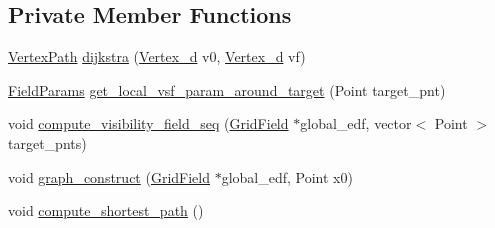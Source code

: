\subsection*{Private Member Functions}
\begin{DoxyCompactItemize}
\item 
\hyperlink{_common_8h_a225da2de31d0161f43841ed31cac064c}{Vertex\+Path} \hyperlink{class_preplanner_adff9209bb0422e7105f8bd3ed577fffd}{dijkstra} (\hyperlink{_common_8h_a1f671d518f573b692b5efa57ed576f36}{Vertex\+\_\+d} v0, \hyperlink{_common_8h_a1f671d518f573b692b5efa57ed576f36}{Vertex\+\_\+d} vf)
\item 
\hyperlink{struct_field_params}{Field\+Params} \hyperlink{class_preplanner_a5b038984427471115b1f4be24abf43b0}{get\+\_\+local\+\_\+vsf\+\_\+param\+\_\+around\+\_\+target} (Point target\+\_\+pnt)
\item 
void \hyperlink{class_preplanner_a1482068998b627fb8e2093e1eafbffd8}{compute\+\_\+visibility\+\_\+field\+\_\+seq} (\hyperlink{struct_grid_field}{Grid\+Field} $\ast$global\+\_\+edf, vector$<$ Point $>$ target\+\_\+pnts)
\item 
void \hyperlink{class_preplanner_a9404e790bfccf6563a7d947e6d11afb7}{graph\+\_\+construct} (\hyperlink{struct_grid_field}{Grid\+Field} $\ast$global\+\_\+edf, Point x0)
\item 
void \hyperlink{class_preplanner_a02321bc5136138f8aebebc494b774374}{compute\+\_\+shortest\+\_\+path} ()
\end{DoxyCompactItemize}
